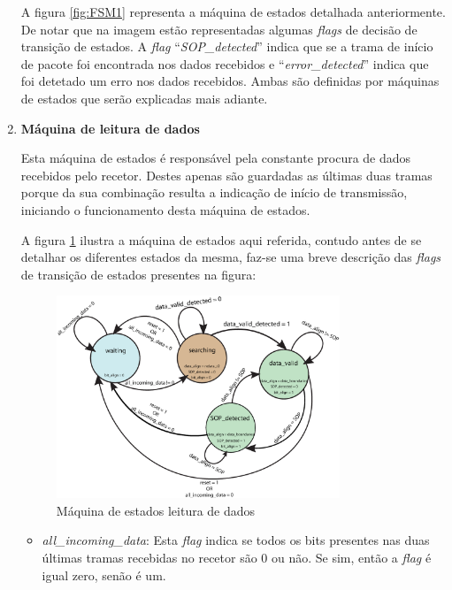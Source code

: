 \documentclass[11pt,a4paper]{article}
\begin{document}
\begin{enumerate}
		A figura \ref{fig:FSM1} representa a máquina de estados detalhada anteriormente. De notar que na imagem estão representadas algumas \textit{flags} de decisão de transição de estados. A \textit{flag} ``\textit{SOP\_detected}'' indica que se a trama de início de pacote foi encontrada nos dados recebidos e ``\textit{error\_detected}'' indica que foi detetado um erro nos dados recebidos. Ambas são definidas por máquinas de estados que serão explicadas mais adiante.
		
		
		\item \textbf{Máquina de leitura de dados}
		
		Esta máquina de estados é responsável pela constante procura de dados recebidos pelo recetor. Destes apenas são guardadas as últimas duas tramas porque da sua combinação resulta a indicação de início de transmissão, iniciando o funcionamento desta máquina de estados.
		
		A figura \ref{fig:fsm2} ilustra a máquina de estados aqui referida, contudo antes de se detalhar os diferentes estados da mesma, faz-se uma breve descrição das \textit{flags} de transição de estados presentes na figura:
		
		\begin{figure}[h!]
			\begin{center}
				\leavevmode
				\includegraphics[width=0.8\textwidth]{fsm_track_data}
				\caption[Máquina de estados leitura de dados]{Máquina de estados leitura de dados}
				\label{fig:fsm2}
			\end{center}
		\end{figure}
		
		\begin{itemize}
			\item \textit{all\_incoming\_data}: Esta \textit{flag} indica se todos os bits presentes nas duas últimas tramas recebidas no recetor são 0 ou não. Se sim, então a \textit{flag} é igual zero, senão é um.
			

\end{itemize}
\end{enumerate}
\end{document}
